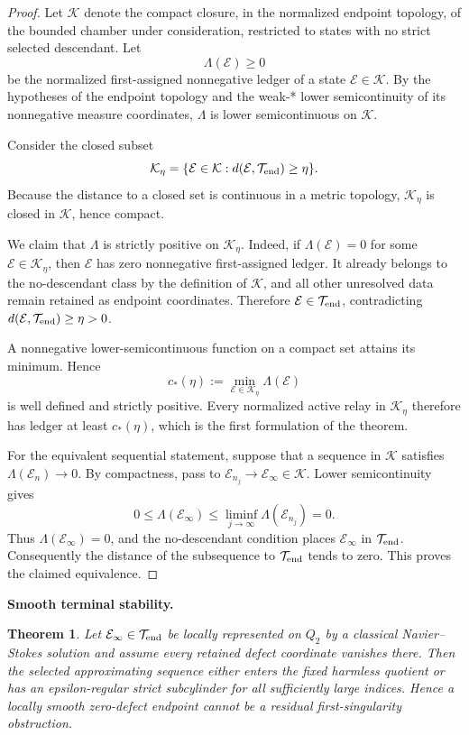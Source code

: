 \documentclass[11pt]{article}
\newtheorem{theorem}{Theorem}[section]
\theoremstyle{definition}\newtheorem{problem}[theorem]{Problem}
\theoremstyle{definition}
\theoremstyle{remark}
\begin{document}
\begin{proof}
Let \(\mathcal K\) denote the compact closure, in the normalized endpoint
topology, of the bounded chamber under consideration, restricted to states
with no strict selected descendant.  Let
\[
 \Lambda(\mathcal E)\ge0
\]
be the normalized first-assigned nonnegative ledger of a state
\(\mathcal E\in\mathcal K\).  By the hypotheses of the endpoint topology and
the weak-* lower semicontinuity of its nonnegative measure coordinates,
\(\Lambda\) is lower semicontinuous on \(\mathcal K\).

Consider the closed subset
\[
 \mathcal K_\eta
 =\{\mathcal E\in\mathcal K:
 d(\mathcal E,\mathcal T_{\rm end})\ge\eta\}.
\]
Because the distance to a closed set is continuous in a metric topology,
\(\mathcal K_\eta\) is closed in \(\mathcal K\), hence compact.

We claim that \(\Lambda\) is strictly positive on \(\mathcal K_\eta\).  Indeed,
if \(\Lambda(\mathcal E)=0\) for some \(\mathcal E\in\mathcal K_\eta\), then
\(\mathcal E\) has zero nonnegative first-assigned ledger.  It already belongs
to the no-descendant class by the definition of \(\mathcal K\), and all other
unresolved data remain retained as endpoint coordinates.  Therefore
\(\mathcal E\in\mathcal T_{\rm end}\), contradicting
\(d(\mathcal E,\mathcal T_{\rm end})\ge\eta>0\).

A nonnegative lower-semicontinuous function on a compact set attains its
minimum.  Hence
\[
 c_*(\eta):=
 \min_{\mathcal E\in\mathcal K_\eta}\Lambda(\mathcal E)
\]
is well defined and strictly positive.  Every normalized active relay in
\(\mathcal K_\eta\) therefore has ledger at least \(c_*(\eta)\), which is the
first formulation of the theorem.

For the equivalent sequential statement, suppose that a sequence in
\(\mathcal K\) satisfies \(\Lambda(\mathcal E_n)\to0\).  By compactness, pass to
\(\mathcal E_{n_j}\to\mathcal E_\infty\in\mathcal K\).  Lower semicontinuity gives
\[
 0\le\Lambda(\mathcal E_\infty)
 \le\liminf_{j\to\infty}\Lambda(\mathcal E_{n_j})=0.
\]
Thus \(\Lambda(\mathcal E_\infty)=0\), and the no-descendant condition places
\(\mathcal E_\infty\) in \(\mathcal T_{\rm end}\).  Consequently the distance of
the subsequence to \(\mathcal T_{\rm end}\) tends to zero.  This proves the
claimed equivalence.
\end{proof}

\medskip
\noindent\textbf{Smooth terminal stability.}
\begin{theorem}
Let \(\mathcal E_\infty\in\mathcal T_{\rm end}\) be locally represented on
\(Q_2\) by a classical Navier--Stokes solution and assume every retained defect
coordinate vanishes there.  Then the selected approximating sequence either
enters the fixed harmless quotient or has an epsilon-regular strict
subcylinder for all sufficiently large indices.  Hence a locally smooth
zero-defect endpoint cannot be a residual first-singularity obstruction.
\end{theorem}
\end{document}
